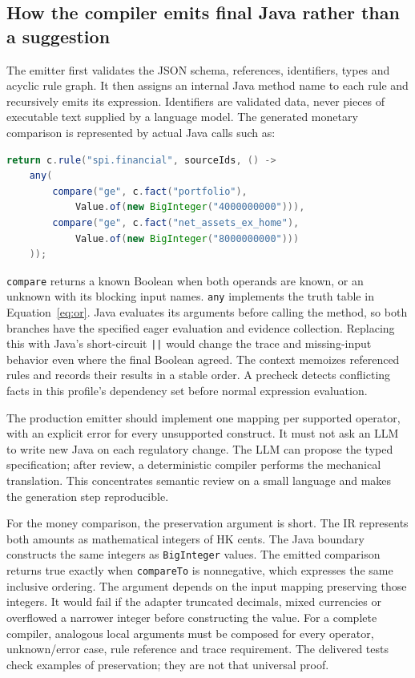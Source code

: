 \subsection{How the compiler emits final Java rather than a suggestion}
\label{merge:P-03d-java-delivery:03}


The emitter first validates the JSON schema, references, identifiers, types and
acyclic rule graph. It then assigns an internal Java method name to each rule
and recursively emits its expression. Identifiers are validated data, never
pieces of executable text supplied by a language model. The generated monetary
comparison is represented by actual Java calls such as:
\begin{lstlisting}[language=Java,caption={The generated financial method's essential body. The complete class is built and tested in the supplied example.}]
return c.rule("spi.financial", sourceIds, () ->
    any(
        compare("ge", c.fact("portfolio"),
            Value.of(new BigInteger("4000000000"))),
        compare("ge", c.fact("net_assets_ex_home"),
            Value.of(new BigInteger("8000000000")))
    ));
\end{lstlisting}
\texttt{compare} returns a known Boolean when both operands are known, or an
unknown with its blocking input names. \texttt{any} implements the truth table
in Equation~\eqref{eq:or}. Java evaluates its arguments before calling the
method, so both branches have the specified eager evaluation and evidence
collection. Replacing this with Java's short-circuit \texttt{||} would change
the trace and missing-input behavior even where the final Boolean agreed.
The context memoizes referenced rules and records their results in a stable
order. A precheck detects conflicting facts in this profile's dependency set
before normal expression evaluation.


The production emitter should implement one mapping per supported operator,
with an explicit error for every unsupported construct. It must not ask an LLM
to write new Java on each regulatory change. The LLM can propose the typed
specification; after review, a deterministic compiler performs the mechanical
translation. This concentrates semantic review on a small language and makes
the generation step reproducible.

For the money comparison, the preservation argument is short. The IR represents
both amounts as mathematical integers of HK cents. The Java boundary constructs
the same integers as \texttt{BigInteger} values. The emitted comparison returns
true exactly when \texttt{compareTo} is nonnegative, which expresses the same
inclusive ordering. The argument depends on the input mapping preserving those
integers. It would fail if the adapter truncated decimals, mixed currencies or
overflowed a narrower integer before constructing the value. For a complete
compiler, analogous local arguments must be composed for every operator,
unknown/error case, rule reference and trace requirement. The delivered tests
check examples of preservation; they are not that universal proof.

